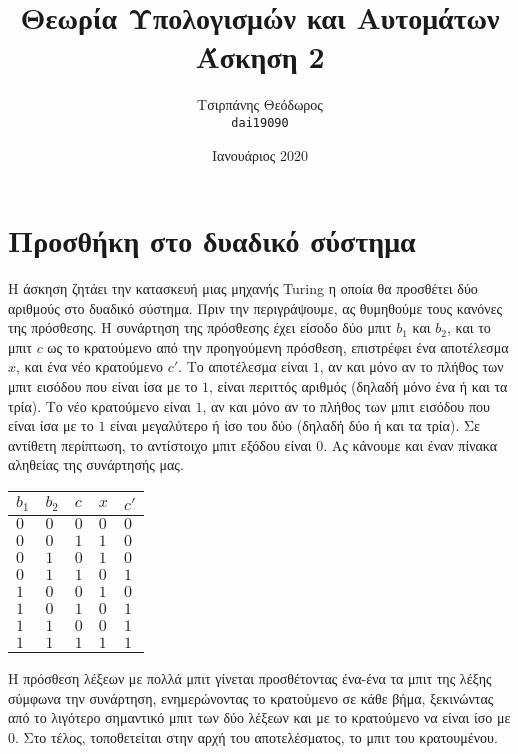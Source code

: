 \documentclass{article}
\title{Θεωρία Υπολογισμών και Αυτομάτων\\ Άσκηση 2}
\author{Τσιρπάνης Θεόδωρος\\ \texttt{dai19090}}
\date{Ιανουάριος 2020}
\begin{document}

\maketitle

\section{Προσθήκη στο δυαδικό σύστημα}

Η άσκηση ζητάει την κατασκευή μιας μηχανής Turing η οποία θα προσθέτει δύο αριθμούς στο δυαδικό σύστημα. Πριν την περιγράψουμε, ας θυμηθούμε τους κανόνες της πρόσθεσης. Η συνάρτηση της πρόσθεσης έχει είσοδο δύο μπιτ $b_1$ και $b_2$, και το μπιτ $c$ ως το κρατούμενο από την προηγούμενη πρόσθεση, επιστρέφει ένα αποτέλεσμα $x$, και ένα νέο κρατούμενο $c'$. Το αποτέλεσμα είναι $1$, αν και μόνο αν το πλήθος των μπιτ εισόδου που είναι ίσα με το $1$, είναι περιττός αριθμός (δηλαδή μόνο ένα ή και τα τρία). Το νέο κρατούμενο είναι $1$, αν και μόνο αν το πλήθος των μπιτ εισόδου που είναι ίσα με το $1$ είναι μεγαλύτερο ή ίσο του δύο (δηλαδή δύο ή και τα τρία). Σε αντίθετη περίπτωση, το αντίστοιχο μπιτ εξόδου είναι $0$. Ας κάνουμε και έναν πίνακα αληθείας της συνάρτησής μας.

\begin{longtable}[c]{|l|l|l||l|l|}
    \hline
    $b_1$ & $b_2$ & $c$ & $x$ & $c'$ \\
    \hline
    $0$ & $0$ & $0$ & $0$ & $0$ \\ \hline
    $0$ & $0$ & $1$ & $1$ & $0$ \\ \hline
    $0$ & $1$ & $0$ & $1$ & $0$ \\ \hline
    $0$ & $1$ & $1$ & $0$ & $1$ \\ \hline
    $1$ & $0$ & $0$ & $1$ & $0$ \\ \hline
    $1$ & $0$ & $1$ & $0$ & $1$ \\ \hline
    $1$ & $1$ & $0$ & $0$ & $1$ \\ \hline
    $1$ & $1$ & $1$ & $1$ & $1$ \\ \hline
\end{longtable}

Η πρόσθεση λέξεων με πολλά μπιτ γίνεται προσθέτοντας ένα-ένα τα μπιτ της λέξης σύμφωνα την συνάρτηση, ενημερώνοντας το κρατούμενο σε κάθε βήμα, ξεκινώντας από το λιγότερο σημαντικό μπιτ των δύο λέξεων και με το κρατούμενο να είναι ίσο με $0$. Στο τέλος, τοποθετείται στην αρχή του αποτελέσματος, το μπιτ του κρατουμένου.
\end{document}
